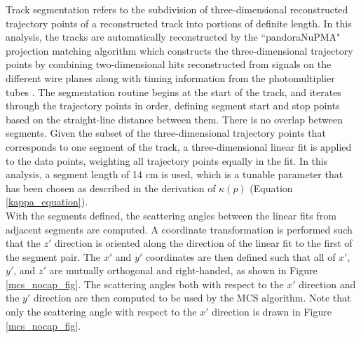 \documentclass[a4paper,11pt]{article}
\begin{document}
Track segmentation refers to the subdivision of three-dimensional reconstructed trajectory points of a reconstructed track into portions of definite length. In this analysis, the tracks are automatically reconstructed by the ``pandoraNuPMA" projection matching algorithm which constructs the three-dimensional trajectory points by combining two-dimensional hits reconstructed from signals on the different wire planes along with timing information from the photomultiplier tubes \cite{Marshall:2015rfa}. The segmentation routine begins at the start of the track, and iterates through the trajectory points in order, defining segment start and stop points based on the straight-line distance between them. There is no overlap between segments. Given the subset of the three-dimensional trajectory points that corresponds to one segment of the track, a three-dimensional linear fit is applied to the data points, weighting all trajectory points equally in the fit. In this analysis, a segment length of 14 cm is used, which is a tunable parameter that has been chosen as described in the derivation of $\kappa(p)$ (Equation \ref{kappa_equation}).\\

With the segments defined, the scattering angles between the linear fits from adjacent segments are computed. A coordinate transformation is performed such that the $z'$ direction is oriented along the direction of the linear fit to the first of the segment pair. The $x'$ and $y'$ coordinates are then defined such that all of $x'$, $y'$, and $z'$ are mutually orthogonal and right-handed, as shown in Figure \ref{mcs_nocap_fig}. The scattering angles both with respect to the $x'$ direction and the $y'$ direction are then computed to be used by the MCS algorithm. Note that only the scattering angle with respect to the $x'$ direction is drawn in Figure \ref{mcs_nocap_fig}.
\end{document}
